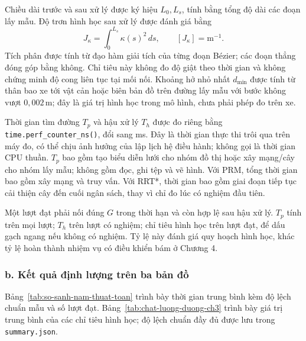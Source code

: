 Chiều dài trước và sau xử lý được ký hiệu \(L_0,L_s\), tính bằng tổng độ dài các đoạn lấy mẫu. Độ trơn hình học sau xử lý được đánh giá bằng
\[
  J_\kappa=\int_0^{L_s}\kappa(s)^2\,ds,
  \qquad [J_\kappa]=\mathrm{m}^{-1}.
\]
Tích phân được tính từ đạo hàm giải tích của từng đoạn Bézier; các đoạn thẳng đóng góp bằng không. Chỉ tiêu này không đo độ giật theo thời gian và không chứng minh độ cong liên tục tại mối nối. Khoảng hở nhỏ nhất \(d_{\min}\) được tính từ thân bao xe tới vật cản hoặc biên bản đồ trên đường lấy mẫu với bước không vượt \(0{,}002\,\mathrm{m}\); đây là giá trị hình học trong mô hình, chưa phải phép đo trên xe.

Thời gian tìm đường \(T_p\) và hậu xử lý \(T_h\) được đo riêng bằng \texttt{time.perf\_counter\_ns()}, đổi sang ms. Đây là thời gian thực thi trôi qua trên máy đo, có thể chịu ảnh hưởng của lập lịch hệ điều hành; không gọi là thời gian CPU thuần. \(T_p\) bao gồm tạo biểu diễn lưới cho nhóm đồ thị hoặc xây mạng/cây cho nhóm lấy mẫu; không gồm đọc, ghi tệp và vẽ hình. Với PRM, tổng thời gian bao gồm xây mạng và truy vấn. Với RRT*, thời gian bao gồm giai đoạn tiếp tục cải thiện cây đến cuối ngân sách, thay vì chỉ đo lúc có nghiệm đầu tiên.

Một lượt đạt phải nối đúng \(G\) trong thời hạn và còn hợp lệ sau hậu xử lý. \(T_p\) tính trên mọi lượt; \(T_h\) trên lượt có nghiệm; chỉ tiêu hình học trên lượt đạt, để dấu gạch ngang nếu không có nghiệm. Tỷ lệ này đánh giá quy hoạch hình học, khác tỷ lệ hoàn thành nhiệm vụ có điều khiển bám ở Chương 4.

\clearpage
\subsubsection*{b. Kết quả định lượng trên ba bản đồ}

Bảng~\ref{tab:so-sanh-nam-thuat-toan} trình bày thời gian trung bình kèm độ lệch chuẩn mẫu và số lượt đạt. Bảng~\ref{tab:chat-luong-duong-ch3} trình bày giá trị trung bình của các chỉ tiêu hình học; độ lệch chuẩn đầy đủ được lưu trong \texttt{summary.json}.

